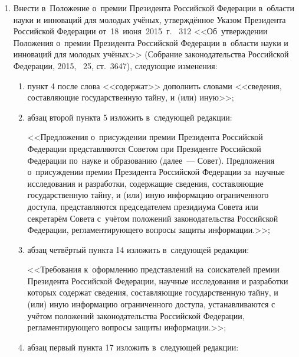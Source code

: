 \documentclass[14pt, a4paper]{extarticle}
\begin{document}
\begin{enumerate}
	\item Внести в~Положение о~премии Президента Российской Федерации в~области науки и инноваций для молодых учёных, утверждённое Указом Президента Российской Федерации от~18~июня~2015~г. \textnumero~312 <<Об~утверждении Положения о~премии Президента Российской Федерации в~области науки и инноваций для молодых учёных>> (Собрание законодательства Российской Федерации, 2015, \textnumero~25, ст.~3647), следующие изменения:
	\begin{enumerate}[label=\asbuk*), ref=\asbuk*]
		\item пункт 4 после слова <<содержат>> дополнить словами <<сведения, составляющие государственную тайну, и (или) иную>>;
		
		\item абзац второй пункта 5 изложить в~следующей редакции:
		
		<<Предложения о~присуждении премии Президента Российской Федерации представляются Советом при Президенте Российской Федерации по~науке и образованию (далее~--- Совет). Предложения о~присуждении премии Президента Российской Федерации за~научные исследования и разработки, содержащие сведения, составляющие государственную тайну, и (или) иную информацию ограниченного доступа, представляются председателем президиума Совета или секретарём Совета с~учётом положений законодательства Российской Федерации, регламентирующего вопросы защиты информации.>>;
		
		\item абзац четвёртый пункта 14 изложить в~следующей редакции:
		
		<<Требования к~оформлению представлений на~соискателей премии Президента Российской Федерации, научные исследования и разработки которых содержат сведения, составляющие государственную тайну, и (или) иную информацию ограниченного доступа, устанавливаются с учётом положений законодательства Российской Федерации, регламентирующего вопросы защиты информации.>>;
		
		\item абзац первый пункта 17 изложить в~следующей редакции:
		

\end{enumerate}
\end{enumerate}
\end{document}
